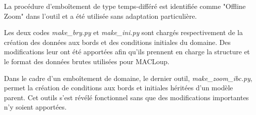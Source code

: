 \documentclass[10pt,a4paper,titlepage]{article}
\begin{document}
La procédure d’emboîtement de type temps-différé est identifiée comme "Offline Zoom" dans l'outil
et a été utilisée sans adaptation particulière.

Les deux codes \textit{make\_bry.py} et \textit{make\_ini.py} sont chargés respectivement de la création des données aux bords et des conditions initiales du domaine.
Des modifications leur ont été apportées afin qu'ils prennent en charge la structure et le format des données brutes utilisées pour MACLoup.

Dans le cadre d'un emboîtement de domaine, le dernier outil, \textit{make\_zoom\_ibc.py}, permet la création de conditions aux bords et initiales héritées d'un modèle parent.
Cet outils s'est révélé fonctionnel sans que des modifications importantes n'y soient apportées.





\end{document}
